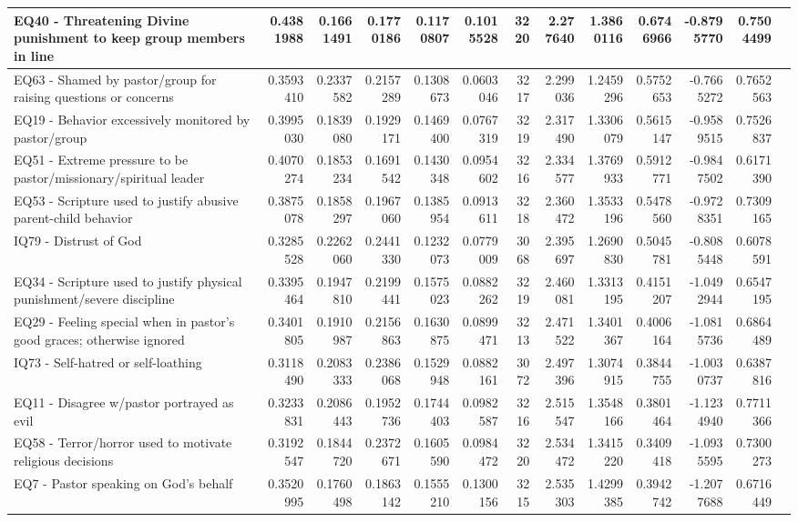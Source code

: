 \documentclass[
  letterpaper,
]{article}
\begin{document}
\begin{table}
\begin{tabular}{l|r|r|r|r|r|r|r|r|r|r|r|l}
\hline
EQ40 - Threatening Divine punishment to keep group members in line & 0.4381988 & 0.1661491 & 0.1770186 & 0.1170807 & 0.1015528 & 3220 & 2.277640 & 1.3860116 & 0.6746966 & -0.8795770 & 0.7504499 & \\
\hline
EQ63 - Shamed by pastor/group for raising questions or concerns & 0.3593410 & 0.2337582 & 0.2157289 & 0.1308673 & 0.0603046 & 3217 & 2.299036 & 1.2459296 & 0.5752653 & -0.7665272 & 0.7652563 & \\
\hline
EQ19 - Behavior excessively monitored by pastor/group & 0.3995030 & 0.1839080 & 0.1929171 & 0.1469400 & 0.0767319 & 3219 & 2.317490 & 1.3306079 & 0.5615147 & -0.9589515 & 0.7526837 & \\
\hline
EQ51 - Extreme pressure to be pastor/missionary/spiritual leader & 0.4070274 & 0.1853234 & 0.1691542 & 0.1430348 & 0.0954602 & 3216 & 2.334577 & 1.3769933 & 0.5912771 & -0.9847502 & 0.6171390 & \\
\hline
EQ53 - Scripture used to justify abusive parent-child behavior & 0.3875078 & 0.1858297 & 0.1967060 & 0.1385954 & 0.0913611 & 3218 & 2.360472 & 1.3533196 & 0.5478560 & -0.9728351 & 0.7309165 & \\
\hline
IQ79 - Distrust of God & 0.3285528 & 0.2262060 & 0.2441330 & 0.1232073 & 0.0779009 & 3068 & 2.395697 & 1.2690830 & 0.5045781 & -0.8085448 & 0.6078591 & \\
\hline
EQ34 - Scripture used to justify physical punishment/severe discipline & 0.3395464 & 0.1947810 & 0.2199441 & 0.1575023 & 0.0882262 & 3219 & 2.460081 & 1.3313195 & 0.4151207 & -1.0492944 & 0.6547195 & \\
\hline
EQ29 - Feeling special when in pastor’s good graces; otherwise ignored & 0.3401805 & 0.1910987 & 0.2156863 & 0.1630875 & 0.0899471 & 3213 & 2.471522 & 1.3401367 & 0.4006164 & -1.0815736 & 0.6864489 & \\
\hline
IQ73 - Self-hatred or self-loathing & 0.3118490 & 0.2083333 & 0.2386068 & 0.1529948 & 0.0882161 & 3072 & 2.497396 & 1.3074915 & 0.3844755 & -1.0030737 & 0.6387816 & \\
\hline
EQ11 - Disagree w/pastor portrayed as evil & 0.3233831 & 0.2086443 & 0.1952736 & 0.1744403 & 0.0982587 & 3216 & 2.515547 & 1.3548166 & 0.3801464 & -1.1234940 & 0.7711366 & \\
\hline
EQ58 - Terror/horror used to motivate religious decisions & 0.3192547 & 0.1844720 & 0.2372671 & 0.1605590 & 0.0984472 & 3220 & 2.534472 & 1.3415220 & 0.3409418 & -1.0935595 & 0.7300273 & \\
\hline
EQ7 - Pastor speaking on God's behalf & 0.3520995 & 0.1760498 & 0.1863142 & 0.1555210 & 0.1300156 & 3215 & 2.535303 & 1.4299385 & 0.3942742 & -1.2077688 & 0.6716449 & \\

\end{tabular}
\end{table}
\end{document}
